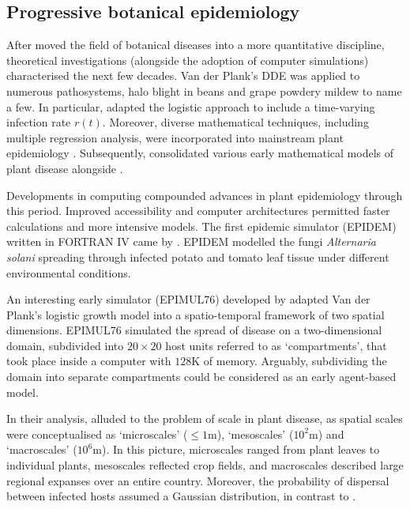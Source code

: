 \subsection{Progressive botanical epidemiology}
\label{sec:prog-epi}
After \cite{van2013plant} moved the field of botanical diseases into a more quantitative discipline,
theoretical investigations (alongside the adoption of computer simulations) characterised the next few decades.
Van der Plank's DDE was applied to numerous pathosystems, halo blight in beans \cite{doi:10.1111/j.1744-7348.1979.tb06527.x} 
and grape powdery mildew \cite{sall1980epidemiology} to name a few. In particular, \cite{sall1980epidemiology} adapted the
logistic approach to include a time-varying infection rate $r(t)$. Moreover, diverse mathematical techniques, 
including multiple  regression analysis, were incorporated into mainstream plant epidemiology \cite{butt1974multiple}. 
Subsequently, \cite{zadoks1979epidemiology} consolidated various early mathematical models of plant disease 
alongside \cite{jeger1984use}.

Developments in computing compounded advances in plant epidemiology through this period. 
Improved accessibility and computer architectures permitted faster calculations and more intensive models. 
The first epidemic simulator (EPIDEM) written in FORTRAN IV came by \cite{waggoner1969epidem}. 
EPIDEM modelled the fungi \textit{Alternaria solani} spreading through infected potato and tomato leaf tissue under different environmental conditions. 
    
An interesting early simulator (EPIMUL76) developed by \cite{zadoks1977role} adapted Van der Plank's logistic growth model into a spatio-temporal framework of two spatial dimensions. 
EPIMUL76 simulated the spread of disease on a two-dimensional domain, subdivided into $20\times 20$ host units referred to as `compartments', that took place inside a computer with $128\mathrm{K}$ of memory.
Arguably, subdividing the domain into separate compartments could be considered as an early agent-based model. 

In their analysis, \cite{zadoks1977role} alluded to the problem of scale in plant disease, as spatial scales
were conceptualised as `microscales' ($\leq 1\mathrm{m}$), `mesoscales' ($10^2\mathrm{m}$) and `macroscales' ($10^6\mathrm{m}$).
In this picture, microscales ranged from plant leaves to individual plants, mesoscales reflected crop fields, and macroscales
described large regional expanses over an entire country. Moreover, the probability of dispersal between infected hosts assumed a
Gaussian distribution, in contrast to \cite{doi:10.1146/annurev.py.06.090168.001201}.

